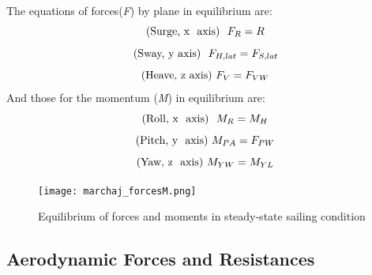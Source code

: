 
The equations of forces(\textit{F}) by plane in equilibrium are:
\begin{equation}\label{eq:force_x}
    \text{(Surge, x  \space axis)  \space} F_{R}=R \\
\end{equation}
\begin{equation}\label{eq:force_y}
    \text{(Sway, y\space axis) \space } \space F_{H,lat}=F_{S,lat}\\
\end{equation}
\begin{equation}\label{eq:force_z}
    \text{(Heave, z\space axis)  } \space F_{V}=F_{VW}
\end{equation}
And those for the momentum (\textit{M}) in equilibrium are:
\begin{equation}\label{eq:m_x}
    \text{(Roll, x  \space axis) \space } M_{R}=M_{H} \\
\end{equation}
\begin{equation}\label{eq:m_y}
    \text{(Pitch, y \space axis)  } \space M_{PA}=F_{PW}\\
\end{equation}
\begin{equation}\label{eq:m_z}
    \text{(Yaw, z \space axis)  } \space M_{YW}=M_{YL}
\end{equation}

 \begin{figure}[ht]
\centering
  \texttt{[image: marchaj\_forcesM.png]}
 \caption{Equilibrium of forces and moments in steady-state sailing condition \cite{marchajaereo1979} }
\label{forces_m}
\end{figure}

\subsection{Aerodynamic Forces and Resistances} \label{sec:aero_forces}

